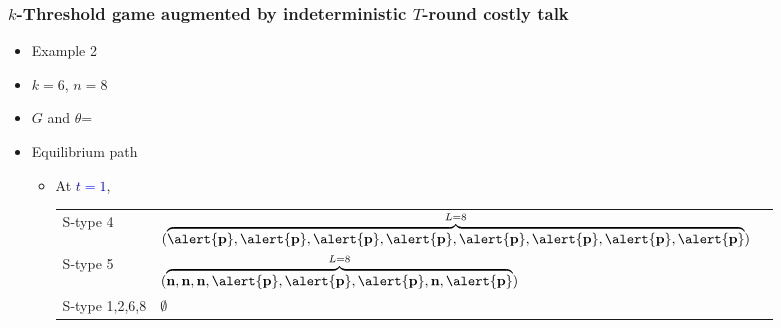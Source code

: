 \documentclass[9pt]{beamer}
\begin{document}
\begin{frame}
 \frametitle{$k$-Threshold game augmented by indeterministic $T$-round costly talk}

\begin{itemize}
\item Example 2
\item $k=6$, $n=8$
\item $G$ and $\theta$=
\begin{center}
\end{center}
\end{itemize}

\begin{itemize}
\item Equilibrium path
\begin{itemize}
\item 
{
At \textcolor{blue}{$t=1$}, 
\begin{table}[h]
\begin{tabular}{ll l}
S-type 4 & $(\overbrace{\alert{\textbf{p}},\alert{\textbf{p}},\alert{\textbf{p}},\alert{\textbf{p}},\alert{\textbf{p}},\alert{\textbf{p}},\alert{\textbf{p}},\alert{\textbf{p}}}^{L=8})$\\
S-type 5 & $(\overbrace{\textbf{n},\textbf{n},\textbf{n},\alert{\textbf{p}},\alert{\textbf{p}},\alert{\textbf{p}},\textbf{n},\alert{\textbf{p}}}^{L=8})$ \\
S-type 1,2,6,8 & $\emptyset$
\end{tabular}
\end{table}
}
\end{itemize}
\end{itemize}
\end{frame}
\end{document}
